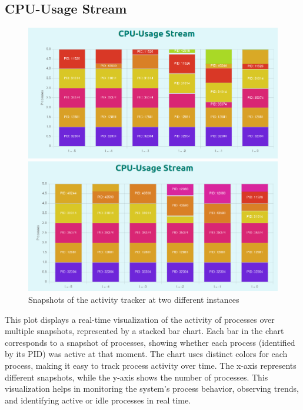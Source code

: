 \documentclass[12pt]{article}
\begin{document}
\subsection{CPU-Usage Stream}
\begin{figure}[H]
    \centering
    \begin{minipage}{0.45\textwidth}
        \centering
        \includegraphics[width=\textwidth]{logos and images/PLOT2_1.png}
    \end{minipage}
    \hfill
    \begin{minipage}{0.45\textwidth}
        \centering
        \includegraphics[width=\textwidth]{logos and images/PLOT2_2.png}
    \end{minipage}
    \caption{Snapshots of the activity tracker at two different instances}
\end{figure}

This plot displays a real-time visualization of the activity of processes over multiple snapshots, represented by a stacked bar chart. Each bar in the chart corresponds to a snapshot of processes, showing whether each process (identified by its PID) was active at that moment. The chart uses distinct colors for each process, making it easy to track process activity over time. The x-axis represents different snapshots, while the y-axis shows the number of processes. This visualization helps in monitoring the system’s process behavior, observing trends, and identifying active or idle processes in real time.
\end{document}
